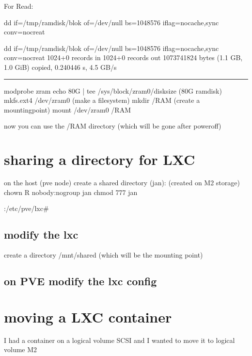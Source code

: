 \documentclass[letterpaper,10pt,english]{sphinxmanual}
\begin{document}
\sphinxAtStartPar
For Read:

\sphinxAtStartPar
dd if=/tmp/ramdisk/blok of=/dev/null bs=1048576 iflag=nocache,sync conv=nocreat

\sphinxAtStartPar
dd if=/tmp/ramdisk/blok of=/dev/null bs=1048576 iflag=nocache,sync conv=nocreat
1024+0 records in
1024+0 records out
1073741824 bytes (1.1 GB, 1.0 GiB) copied, 0.240446 s, 4.5 GB/s


\bigskip\hrule\bigskip


\sphinxAtStartPar
modprobe zram
echo 80G | tee /sys/block/zram0/disksize    (80G ramdisk)
mkfs.ext4 /dev/zram0  (make a filesystem)
mkdir /RAM   (create a mountingpoint)
mount /dev/zram0 /RAM

\sphinxAtStartPar
now you can use the /RAM directory (which will be gone after poweroff)

\sphinxstepscope


\chapter{sharing a directory for LXC}
\label{\detokenize{share:sharing-a-directory-for-lxc}}\label{\detokenize{share::doc}}
\sphinxAtStartPar
on the host (pve node) create a shared directory (jan): (created on M2 storage)
chown \sphinxhyphen{}R nobody:nogroup jan
chmod 777 jan

\sphinxAtStartPar
{}:/etc/pve/lxc\#


\section{modify the lxc}
\label{\detokenize{share:modify-the-lxc}}
\sphinxAtStartPar
create a directory /mnt/shared (which will be the mounting point)


\section{on PVE modify the lxc config}
\label{\detokenize{share:on-pve-modify-the-lxc-config}}
\sphinxstepscope


\chapter{moving a LXC container}
\label{\detokenize{moving:moving-a-lxc-container}}\label{\detokenize{moving::doc}}
\sphinxAtStartPar
I had a container on a logical volume SCSI and I wanted to move it to logical volume M2
\end{document}
